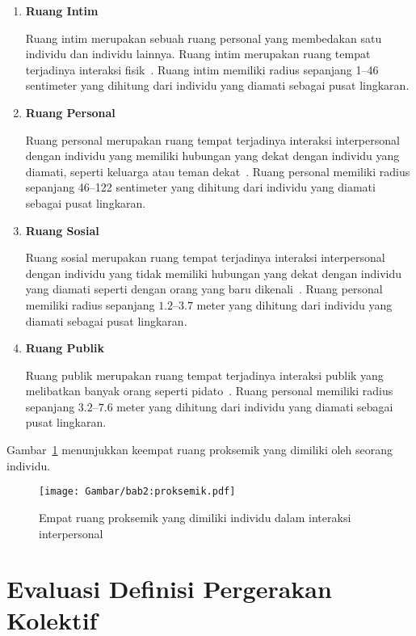 \begin{enumerate}
    \item \textbf{Ruang Intim}
    
    Ruang intim merupakan sebuah ruang personal yang membedakan satu individu dan individu lainnya. Ruang intim merupakan ruang tempat terjadinya interaksi fisik~\cite{hall:06:proxemic}. Ruang intim memiliki radius sepanjang 1--46 sentimeter yang dihitung dari individu yang diamati sebagai pusat lingkaran. 
    
    \item \textbf{Ruang Personal}
    
    Ruang personal merupakan ruang tempat terjadinya interaksi interpersonal dengan individu yang memiliki hubungan yang dekat dengan individu yang diamati, seperti keluarga atau teman dekat~\cite{hall:06:proxemic}. Ruang personal memiliki radius sepanjang 46--122 sentimeter yang dihitung dari individu yang diamati  sebagai pusat lingkaran. 
    
    \item \textbf{Ruang Sosial}
    
    Ruang sosial merupakan ruang tempat terjadinya interaksi interpersonal dengan individu yang tidak memiliki hubungan yang dekat dengan individu yang diamati seperti dengan orang yang baru dikenali~\cite{hall:06:proxemic}. Ruang personal memiliki radius sepanjang $1.2$--$3.7$ meter yang dihitung dari individu yang diamati sebagai pusat lingkaran. 
    
    \item \textbf{Ruang Publik}
    
    Ruang publik merupakan ruang tempat terjadinya interaksi publik yang melibatkan banyak orang seperti pidato~\cite{hall:06:proxemic}. Ruang personal memiliki radius sepanjang $3.2$--$7.6$ meter yang dihitung dari individu yang diamati sebagai pusat lingkaran. 
\end{enumerate}

Gambar~\ref{bab2:proksemik} menunjukkan keempat ruang proksemik yang dimiliki oleh seorang individu.

\begin{figure}[h]
    \centering
    \texttt{[image: Gambar/bab2:proksemik.pdf]}
    \caption{Empat ruang proksemik yang dimiliki individu dalam interaksi interpersonal}
    \label{bab2:proksemik}
\end{figure}

\section{Evaluasi Definisi Pergerakan Kolektif}
\label{sec:eval-theory}

